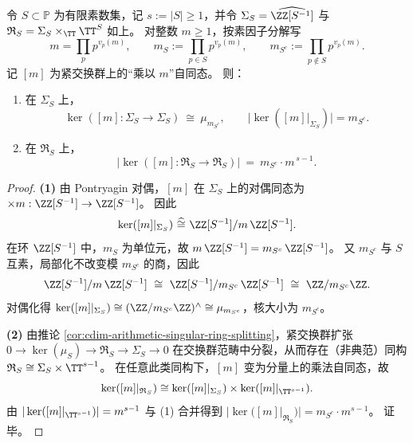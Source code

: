 \begin{theorem}\label{thm:cdim-solenoid-arithmetic-singular-ring-torsion-kernel-formula}
令 \(S\subset\mathbb{P}\) 为有限素数集，记 \(s:=|S|\ge 1\)，并令 \(\Sigma_S=\widehat{\ZZ[S^{-1}]}\) 与 \(\mathfrak{R}_S=\Sigma_S\times_{\TT}\TT^{S}\) 如上。
对整数 \(m\ge 1\)，按素因子分解写
\[
m=\prod_{p}p^{v_p(m)},
\qquad
m_{S}:=\prod_{p\in S}p^{v_p(m)},
\qquad
m_{S^c}:=\prod_{p\notin S}p^{v_p(m)}.
\]
记 \([m]\) 为紧交换群上的“乘以 \(m\)”自同态。
则：
\begin{enumerate}
  \item 在 \(\Sigma_S\) 上，
  \[
  \ker([m]:\Sigma_S\to \Sigma_S)\ \cong\ \mu_{m_{S^c}},
  \qquad
  \bigl|\ker([m]|_{\Sigma_S})\bigr|=m_{S^c}.
  \]
  \item 在 \(\mathfrak{R}_S\) 上，
  \[
  \bigl|\ker([m]:\mathfrak{R}_S\to \mathfrak{R}_S)\bigr|
  \ =\ m_{S^c}\cdot m^{\,s-1}.
  \]
\end{enumerate}
\end{theorem}

\begin{proof}
\textbf{(1)} 由 Pontryagin 对偶，\([m]\) 在 \(\Sigma_S\) 上的对偶同态为
\(\times m:\ZZ[S^{-1}]\to \ZZ[S^{-1}]\)。
因此
\[
\ker([m]|_{\Sigma_S})\ \widehat{\cong}\ \ZZ[S^{-1}]/m\,\ZZ[S^{-1}].
\]
在环 \(\ZZ[S^{-1}]\) 中，\(m_S\) 为单位元，故
\(
m\,\ZZ[S^{-1}]=m_{S^c}\,\ZZ[S^{-1}]
\)。
又 \(m_{S^c}\) 与 \(S\) 互素，局部化不改变模 \(m_{S^c}\) 的商，因此
\[
\ZZ[S^{-1}]/m\,\ZZ[S^{-1}]
\ \cong\
\ZZ[S^{-1}]/m_{S^c}\,\ZZ[S^{-1}]
\ \cong\
\ZZ/m_{S^c}\ZZ.
\]
对偶化得
\(
\ker([m]|_{\Sigma_S})\cong (\ZZ/m_{S^c}\ZZ)^\wedge\cong \mu_{m_{S^c}}
\)，核大小为 \(m_{S^c}\)。
\par
\textbf{(2)} 由推论 \ref{cor:cdim-arithmetic-singular-ring-splitting}，紧交换群扩张
\(
0\to \ker(\mu_S)\to \mathfrak{R}_S\to \Sigma_S\to 0
\)
在交换群范畴中分裂，从而存在（非典范）同构
\(
\mathfrak{R}_S\cong \Sigma_S\times \TT^{s-1}
\)。
在任意此类同构下，\([m]\) 变为分量上的乘法自同态，故
\[
\ker([m]|_{\mathfrak{R}_S})
\cong
\ker([m]|_{\Sigma_S})\times \ker([m]|_{\TT^{s-1}}).
\]
由 \(|\ker([m]|_{\TT^{s-1}})|=m^{s-1}\) 与 (1) 合并得到
\(
|\ker([m]|_{\mathfrak{R}_S})|=m_{S^c}\cdot m^{s-1}
\)。
证毕。
\end{proof}

\endinput
